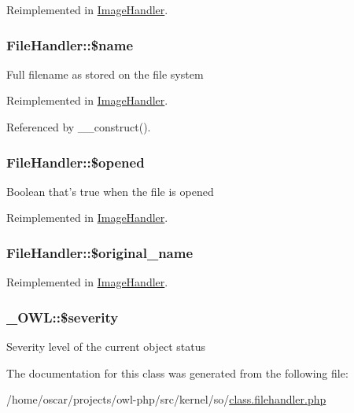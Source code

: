 Reimplemented in \hyperlink{classImageHandler_ac56acda82f7ece75d33f6c57845a727e}{ImageHandler}.

\subsubsection[{\$name}]{\setlength{\rightskip}{0pt plus 5cm}FileHandler::\$name}\label{classFileHandler_a94903bd51b241928ed415ad271c38805}
Full filename as stored on the file system 

Reimplemented in \hyperlink{classImageHandler_a517b3d7ff8643cca1dc2080523bfe2d6}{ImageHandler}.



Referenced by \_\-\_\-construct().

\subsubsection[{\$opened}]{\setlength{\rightskip}{0pt plus 5cm}FileHandler::\$opened}\label{classFileHandler_a061409b2bbd2e13bc47415527c0de720}
Boolean that's true when the file is opened 

Reimplemented in \hyperlink{classImageHandler_a6a87b3626bd0a457c6937b3e9b1cc69b}{ImageHandler}.

\subsubsection[{\$original\_\-name}]{\setlength{\rightskip}{0pt plus 5cm}FileHandler::\$original\_\-name}\label{classFileHandler_a477708585850c3c8725ccf56bfe0b4a8}


Reimplemented in \hyperlink{classImageHandler_a1712c9444d65879aab111260767afaab}{ImageHandler}.

\subsubsection[{\$severity}]{\setlength{\rightskip}{0pt plus 5cm}\_\-OWL::\$severity}\label{class__OWL_ad26b40a9dbbacb33e299b17826f8327c}
Severity level of the current object status 

The documentation for this class was generated from the following file:\begin{DoxyCompactItemize}
\item 
/home/oscar/projects/owl-\/php/src/kernel/so/\hyperlink{class_8filehandler_8php}{class.filehandler.php}\end{DoxyCompactItemize}

